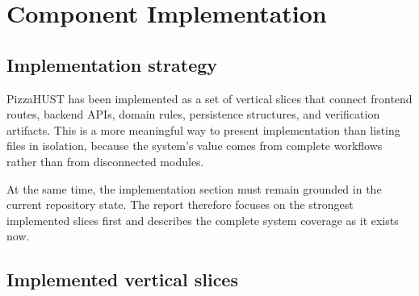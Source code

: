 \section{Component Implementation}

\subsection{Implementation strategy}

PizzaHUST has been implemented as a set of vertical slices that connect frontend routes, backend APIs, domain rules, persistence structures, and verification artifacts. This is a more meaningful way to present implementation than listing files in isolation, because the system's value comes from complete workflows rather than from disconnected modules.

At the same time, the implementation section must remain grounded in the current repository state. The report therefore focuses on the strongest implemented slices first and describes the complete system coverage as it exists now.

\subsection{Implemented vertical slices}

